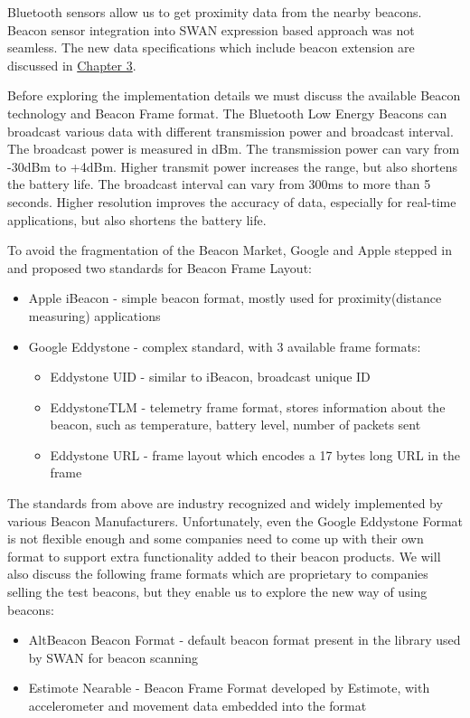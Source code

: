 Bluetooth sensors allow us to get proximity data from the nearby beacons. Beacon sensor integration into SWAN expression based approach was not seamless.
The new data specifications which include beacon extension are discussed in \hyperref[Chapter3]{Chapter 3}.

Before exploring the implementation details we must discuss the available Beacon technology and Beacon Frame format.
The Bluetooth Low Energy Beacons can broadcast various data with different transmission power and broadcast interval.
The broadcast power is measured in dBm\cite{dbiRef}. The transmission power can vary from -30dBm to +4dBm. Higher transmit power
increases the range, but also shortens the battery life. The broadcast interval can vary from 300ms to more than 5 seconds. Higher resolution improves the accuracy of data,
especially for real-time applications, but also shortens the battery life.

To avoid the fragmentation of the Beacon Market, Google and Apple stepped in and proposed two standards for Beacon Frame Layout:
\begin{itemize}
 \item Apple iBeacon - simple beacon format, mostly used for proximity(distance measuring) applications
 \item Google Eddystone - complex standard, with 3 available frame formats:
 \begin{itemize}
  \item Eddystone UID - similar to iBeacon, broadcast unique ID
  \item EddystoneTLM - telemetry frame format, stores information about the beacon, such as temperature, battery level, number of packets sent
  \item Eddystone URL - frame layout which encodes a 17 bytes long URL in the frame
 \end{itemize}
\end{itemize}

The standards from above are industry recognized and widely implemented by various Beacon Manufacturers.
Unfortunately, even the Google Eddystone Format is not flexible enough and some companies need to come up with their own format to support extra functionality 
added to  their beacon products. We will also discuss the following frame formats which are proprietary to companies selling the test beacons, but they enable us to explore the
new way of using beacons:
\begin{itemize}
 \item AltBeacon Beacon Format - default beacon format present in the library used by SWAN for beacon scanning
 \item Estimote Nearable - Beacon Frame Format developed by Estimote\cite{estimote_company}, with accelerometer and movement data embedded into the format
\end{itemize}


